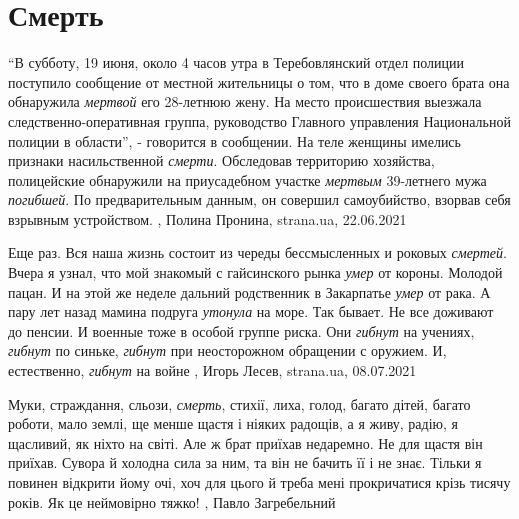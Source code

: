  
 
 
 
 
\chapter{Смерть}
\label{sec:slova.smert}

\enquote{В субботу, 19 июня, около 4 часов утра в Теребовлянский отдел полиции
поступило сообщение от местной жительницы о том, что в доме своего брата она
обнаружила \emph{мертвой} его 28-летнюю жену. На место происшествия выезжала
следственно-оперативная группа, руководство Главного управления Национальной
полиции в области}, - говорится в сообщении.  На теле женщины имелись признаки
насильственной \emph{смерти}. Обследовав территорию хозяйства, полицейские обнаружили
на приусадебном участке \emph{мертвым} 39-летнего мужа \emph{погибшей}. По предварительным
данным, он совершил самоубийство, взорвав себя взрывным устройством.
  , Полина Пронина, strana.ua, 22.06.2021

Еще раз. Вся наша жизнь состоит из череды бессмысленных и роковых \emph{смертей}.
Вчера я узнал, что мой знакомый с гайсинского рынка \emph{умер} от короны. Молодой
пацан. И на этой же неделе дальний родственник в Закарпатье \emph{умер} от рака. А
пару лет назад мамина подруга \emph{утонула} на море. Так бывает. Не все доживают до
пенсии.  И военные тоже в особой группе риска. Они \emph{гибнут} на учениях, \emph{гибнут} по
синьке, \emph{гибнут} при неосторожном обращении с оружием. И, естественно, \emph{гибнут} на
войне
, 
Игорь Лесев, strana.ua, 08.07.2021

Муки, страждання, сльози, \emph{смерть}, стихії, лиха, голод, багато дітей, багато
роботи, мало землі, ще менше щастя і ніяких радощів, а я живу, радію, я
щасливий, як ніхто на світі.  Але ж брат приїхав недаремно. Не для щастя він
приїхав. Сувора й холодна сила за ним, та він не бачить її і не знає. Тільки я
повинен відкрити йому очі, хоч для цього й треба мені прокричатися крізь тисячу
років.  Як це неймовірно тяжко!
, Павло Загребельний 

